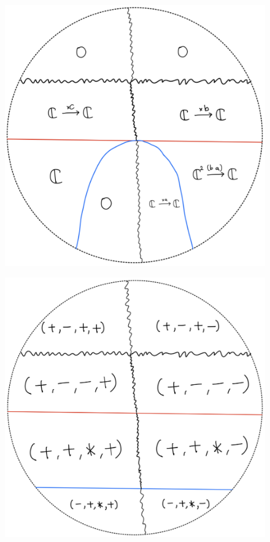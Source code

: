 \begin{figure}[H]
    \centering
    \includegraphics[scale = 0.45]{diagrams/cobord'2/37.png} 
    \caption{}
    \label{fig:your-label}
\end{figure}
\begin{figure}[H]
    \centering
    \includegraphics[scale = 0.45]{diagrams/cobord'2/38.png} 
    \caption{}
    \label{fig:your-label}
\end{figure}
